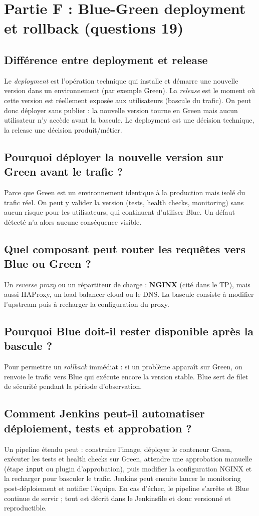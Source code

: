 \documentclass[11pt,a4paper]{article}
\begin{document}
\section{Partie F : Blue-Green deployment et rollback (questions 19)}

\subsection{Différence entre deployment et release}
Le \emph{deployment} est l'opération technique qui installe et démarre une nouvelle
version dans un environnement (par exemple Green). La \emph{release} est le moment où
cette version est réellement exposée aux utilisateurs (bascule du trafic). On peut donc
déployer sans publier : la nouvelle version tourne en Green mais aucun utilisateur n'y
accède avant la bascule. Le deployment est une décision technique, la release une
décision produit/métier.

\subsection{Pourquoi déployer la nouvelle version sur Green avant le trafic ?}
Parce que Green est un environnement identique à la production mais isolé du trafic réel.
On peut y valider la version (tests, health checks, monitoring) sans aucun risque pour les
utilisateurs, qui continuent d'utiliser Blue. Un défaut détecté n'a alors aucune
conséquence visible.

\subsection{Quel composant peut router les requêtes vers Blue ou Green ?}
Un \emph{reverse proxy} ou un répartiteur de charge : \textbf{NGINX} (cité dans le TP),
mais aussi HAProxy, un load balancer cloud ou le DNS. La bascule consiste à modifier
l'upstream puis à recharger la configuration du proxy.

\subsection{Pourquoi Blue doit-il rester disponible après la bascule ?}
Pour permettre un \emph{rollback} immédiat : si un problème apparaît sur Green, on
renvoie le trafic vers Blue qui exécute encore la version stable. Blue sert de filet de
sécurité pendant la période d'observation.

\subsection{Comment Jenkins peut-il automatiser déploiement, tests et approbation ?}
Un pipeline étendu peut : construire l'image, déployer le conteneur Green, exécuter les
tests et health checks sur Green, attendre une approbation manuelle (étape \texttt{input}
ou plugin d'approbation), puis modifier la configuration NGINX et la recharger pour
basculer le trafic. Jenkins peut ensuite lancer le monitoring post-déploiement et
notifier l'équipe. En cas d'échec, le pipeline s'arrête et Blue continue de servir ; tout
est décrit dans le Jenkinsfile et donc versionné et reproductible.
\end{document}
